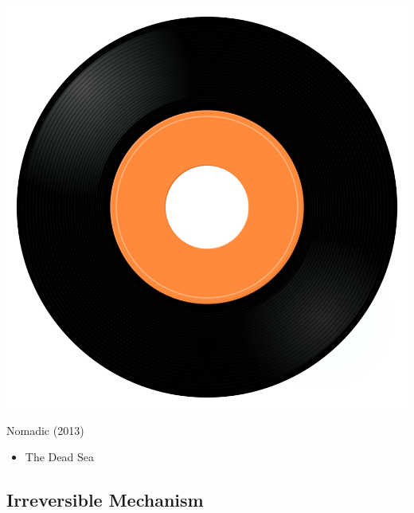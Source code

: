\begin{minipage}[t]{0.25\textwidth}\vspace{0pt}
\captionsetup{type=figure}
\includegraphics[width=\textwidth]{Images/cover.png}
\caption*{Nomadic (2013)}
\end{minipage}
\begin{minipage}[t]{0.25\textwidth}\vspace{0pt}
\begin{itemize}[nosep,leftmargin=1em,labelwidth=*,align=left]
	\setlength{\itemsep}{0pt}
	\item The Dead Sea
\end{itemize}
\end{minipage}

\subsection{Irreversible Mechanism}

